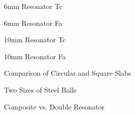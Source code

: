 \documentclass[11pt]{article}
\begin{document}
\begin{figure}[htbp]
  \centerline{  }
  \caption{6mm Resonator Tc}
  \label{fig:6mmTc}
\end{figure}

\begin{figure}[htbp]
  \centerline{  }
  \caption{6mm Resonator Fa}
  \label{fig:6mmFa}
\end{figure}

\begin{figure}[htbp]
  \centerline{  }
  \caption{10mm Resonator Tc}
  \label{fig:10mmTc}
\end{figure}

\begin{figure}[htbp]
  \centerline{  }
  \caption{10mm Resonator Fa}
  \label{fig:10mmFa}
\end{figure}

\begin{figure}[htbp]
  \centerline{  }
  \caption{Comparison of Circular and Square Slabs}
  \label{fig:SqrCirc}
\end{figure}

\begin{figure}[htbp]
  \centerline{  }
  \caption{Two Sizes of Steel Balls}
  \label{fig:TwoRes}
\end{figure}

\begin{figure}[htbp]
  \centerline{  }
  \caption{Composite vs. Double Resonator}
  \label{fig:DoubleRes}
\end{figure}
\end{document}

